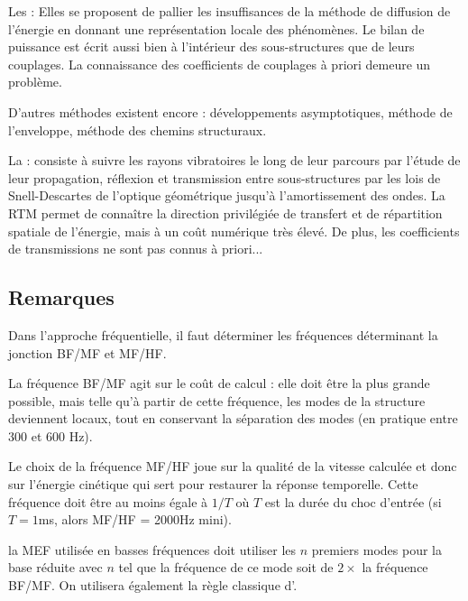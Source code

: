 \bigskip
Les :
Elles se proposent de pallier les insuffisances de la méthode de diffusion de l'énergie
en donnant une représentation locale des phénomènes. Le bilan de puissance est
écrit aussi bien à l'intérieur des sous-structures que de leurs couplages.
La connaissance des coefficients de couplages à priori demeure un problème.

\bigskip
D'autres méthodes existent encore : développements asymptotiques,
méthode de l'enveloppe, méthode des chemins structuraux.

La :
consiste à suivre les rayons vibratoires le long
de leur parcours par l'étude de leur propagation, réflexion et transmission
entre sous-structures par les lois de Snell-Descartes
de l'optique géométrique jusqu'à l'amortissement des ondes.
La RTM permet de connaître la direction privilégiée de transfert et de
répartition spatiale de l'énergie, mais à un coût numérique très
élevé. De plus, les coefficients de transmissions ne sont pas connus à priori...

\medskip
\subsection{Remarques}
Dans l'approche fréquentielle, il faut déterminer les fréquences déterminant
la jonction BF/MF et MF/HF.

La fréquence BF/MF agit sur le coût de calcul : elle doit être la plus grande possible, mais
telle qu'à partir de cette fréquence, les modes de la structure deviennent locaux,
tout en conservant la séparation des modes (en pratique entre 300 et 600 Hz).

Le choix de la fréquence MF/HF joue sur la qualité de la vitesse calculée
et donc sur l'énergie cinétique qui sert pour restaurer la réponse
temporelle. Cette fréquence doit être au moins égale à $1/T$ où
$T$ est la durée du choc d'entrée (si $T=1$ms, alors MF/HF = 2000Hz mini).

la MEF utilisée en basses fréquences doit utiliser les $n$ premiers modes pour la base réduite avec $n$ tel que la fréquence de ce mode soit de $2\times$ la fréquence BF/MF. On utilisera également la règle classique d'.

